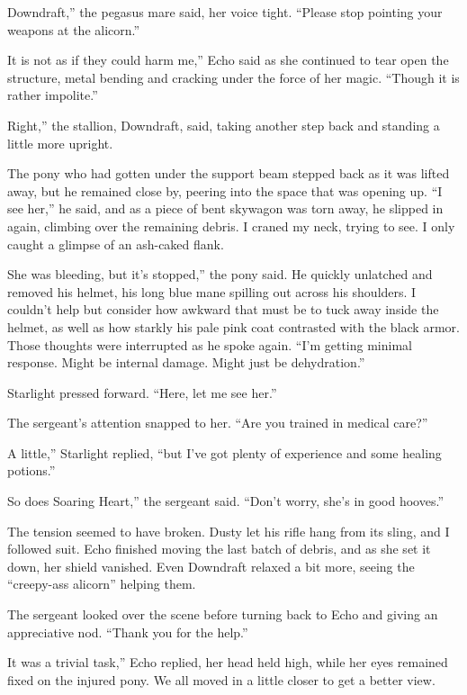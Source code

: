 \leavevmode{}Downdraft,” the pegasus mare said, her voice tight. “Please stop pointing your weapons at the alicorn.”

\leavevmode{}It is not as if they could harm me,” Echo said as she continued to tear open the structure, metal bending and cracking under the force of her magic. “Though it is rather impolite.”

\leavevmode{}Right,” the stallion, Downdraft, said, taking another step back and standing a little more upright.

The pony who had gotten under the support beam stepped back as it was lifted away, but he remained close by, peering into the space that was opening up. “I see her,” he said, and as a piece of bent skywagon was torn away, he slipped in again, climbing over the remaining debris. I craned my neck, trying to see. I only caught a glimpse of an ash-caked flank.

\leavevmode{}She was bleeding, but it’s stopped,” the pony said. He quickly unlatched and removed his helmet, his long blue mane spilling out across his shoulders. I couldn’t help but consider how awkward that must be to tuck away inside the helmet, as well as how starkly his pale pink coat contrasted with the black armor. Those thoughts were interrupted as he spoke again. “I’m getting minimal response. Might be internal damage. Might just be dehydration.”

Starlight pressed forward. “Here, let me see her.”

The sergeant’s attention snapped to her. “Are you trained in medical care?”

\leavevmode{}A little,” Starlight replied, “but I’ve got plenty of experience and some healing potions.”

\leavevmode{}So does Soaring Heart,” the sergeant said. “Don’t worry, she’s in good hooves.”

The tension seemed to have broken. Dusty let his rifle hang from its sling, and I followed suit. Echo finished moving the last batch of debris, and as she set it down, her shield vanished. Even Downdraft relaxed a bit more, seeing the “creepy-ass alicorn” helping them.

The sergeant looked over the scene before turning back to Echo and giving an appreciative nod. “Thank you for the help.”

\leavevmode{}It was a trivial task,” Echo replied, her head held high, while her eyes remained fixed on the injured pony. We all moved in a little closer to get a better view.

